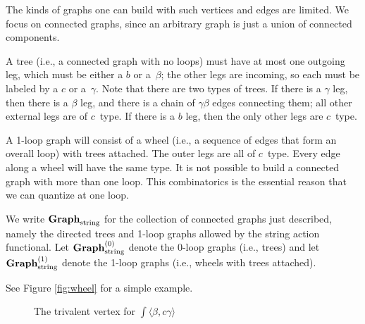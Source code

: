 The kinds of graphs one can build with such vertices and edges are limited.
We focus on connected graphs, since an arbitrary graph is just a union of connected components.

A tree (i.e., a connected graph with no loops) must have at most one outgoing leg,
which must be either a $b$ or a~$\beta$;
the other legs are incoming, so each must be labeled by a $c$ or a~$\gamma$.
Note that there are two types of trees.
If there is a $\gamma$ leg, then there is a $\beta$ leg,
and there is a chain of $\gamma\beta$ edges connecting them;
all other external legs are of $c$~type.
If there is a $b$ leg, then the only other legs are $c$~type.

A 1-loop graph will consist of a wheel (i.e., a sequence of edges that form an overall loop)
with trees attached.
The outer legs are all of $c$~type.
Every edge along a wheel will have the same type.
It is not possible to build a connected graph with more than one loop.
This combinatorics is the essential reason that we can quantize at one loop.

We write ${\bf Graph}_{\rm string}$ for the collection of connected graphs just described,
namely the directed trees and 1-loop graphs allowed by the string action functional.
Let ${\bf Graph}_{\rm string}^{(0)}$ denote the 0-loop graphs (i.e., trees) and let ${\bf Graph}_{\rm string}^{(1)}$ denote the 1-loop graphs (i.e., wheels with trees attached).

See Figure \ref{fig:wheel} for a simple example.

\begin{figure}
\caption{The trivalent vertex for $\int \langle \beta, c \gamma\rangle$}
\label{fig:vertex}
\end{figure}


